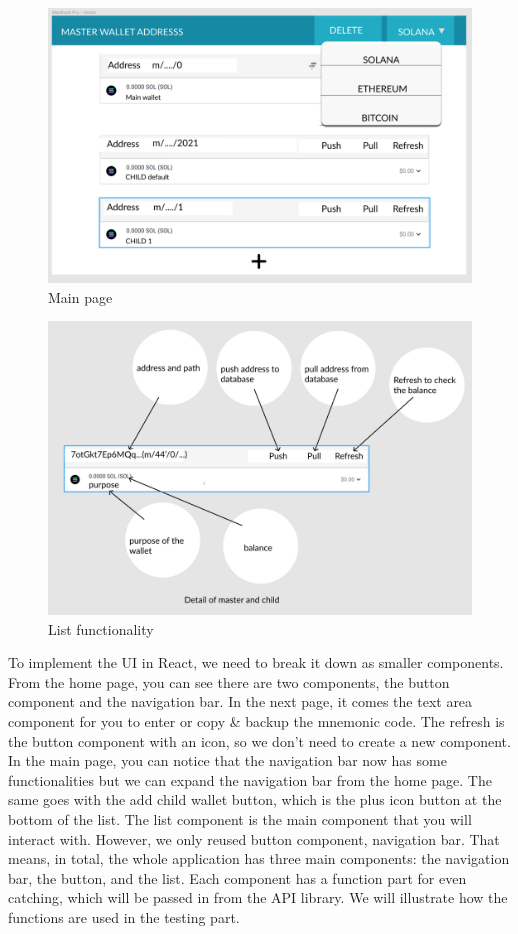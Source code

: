 \begin{figure}[!h]
  \centering
  \includegraphics[width=1\textwidth]{images/component04.png}
  \caption[Main page]{Main page}
  \label{fig:maine_page}
\end{figure}

\begin{figure}[!h]
  \centering
  \includegraphics[width=1\textwidth]{images/component05.png}
  \caption[List functionality]{List functionality}
  \label{fig:list_function}
\end{figure}

To implement the UI in React, we need to break it down as smaller components. From the home page, you can see there are two components, the button component and the navigation bar. In the next page, it comes the text area component for you to enter or copy \& backup the mnemonic code. The refresh is the button component with an icon, so we don't need to create a new component. In the main page, you can notice that the navigation bar now has some functionalities but we can expand the navigation bar from the home page. The same goes with the add child wallet button, which is the plus icon button at the bottom of the list. The list component is the main component that you will interact with. However, we only reused button component, navigation bar. That means, in total, the whole application has three main components: the navigation bar, the button, and the list. Each component has a function part for even catching, which will be passed in from the API library. We will illustrate how the functions are used in the testing part.
